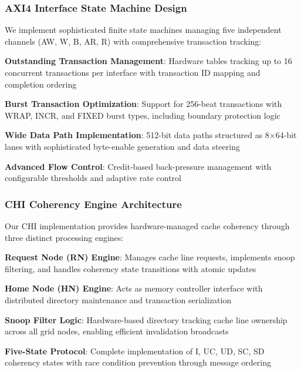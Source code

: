 \documentclass[11pt,a4paper]{article}
\begin{document}
\subsubsection{AXI4 Interface State Machine Design}
We implement sophisticated finite state machines managing five independent channels (AW, W, B, AR, R) with comprehensive transaction tracking:

\begin{techlist}
    \item \textbf{Outstanding Transaction Management}: Hardware tables tracking up to 16 concurrent transactions per interface with transaction ID mapping and completion ordering
    \item \textbf{Burst Transaction Optimization}: Support for 256-beat transactions with WRAP, INCR, and FIXED burst types, including boundary protection logic
    \item \textbf{Wide Data Path Implementation}: 512-bit data paths structured as 8×64-bit lanes with sophisticated byte-enable generation and data steering
    \item \textbf{Advanced Flow Control}: Credit-based back-pressure management with configurable thresholds and adaptive rate control
\end{techlist}

\subsubsection{CHI Coherency Engine Architecture}
Our CHI implementation provides hardware-managed cache coherency through three distinct processing engines:

\begin{techlist}
    \item \textbf{Request Node (RN) Engine}: Manages cache line requests, implements snoop filtering, and handles coherency state transitions with atomic updates
    \item \textbf{Home Node (HN) Engine}: Acts as memory controller interface with distributed directory maintenance and transaction serialization
    \item \textbf{Snoop Filter Logic}: Hardware-based directory tracking cache line ownership across all grid nodes, enabling efficient invalidation broadcasts
    \item \textbf{Five-State Protocol}: Complete implementation of I, UC, UD, SC, SD coherency states with race condition prevention through message ordering
\end{techlist}
\end{document}
